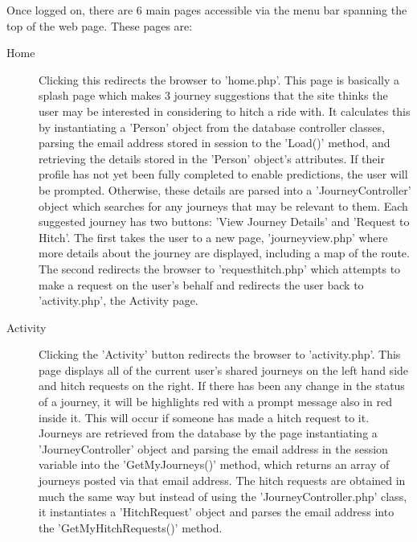 		Once logged on, there are 6 main pages accessible via the menu bar spanning the top of the web page. These pages are: 
		\begin{description}
		\item[Home] Clicking this redirects the browser to 'home.php'. This page is basically a splash page which makes 3 journey suggestions that the site thinks the user may be interested in considering to hitch a ride with. It calculates this by instantiating a 'Person' object from the database controller classes, parsing the email address stored in session to the 'Load()' method, and retrieving the details stored in the 'Person' object's attributes. If their profile has not yet been fully completed to enable predictions, the user will be prompted. Otherwise, these details are parsed into a 'Journey\textunderscore Controller' object which searches for any journeys that may be relevant to them. Each suggested journey has two buttons: 'View Journey Details' and 'Request to Hitch'. The first takes the user to a new page, 'journey\textunderscore view.php' where more details about the journey are displayed, including a map of the route. The second redirects the browser to 'request\textunderscore hitch.php' which attempts to make a request on the user's behalf and redirects the user back to 'activity.php', the Activity page.
		\item[Activity] Clicking the 'Activity' button redirects the browser to 'activity.php'. This page displays all of the current user's shared journeys on the left hand side and hitch requests on the right. If there has been any change in the status of a journey, it will be highlights red with a prompt message also in red inside it. This will occur if someone has made a hitch request to it. Journeys are retrieved from the database by the page instantiating a 'Journey\textunderscore Controller' object and parsing the email address in the session variable into the 'GetMyJourneys()' method, which returns an array of journeys posted via that email address. The hitch requests are obtained in much the same way but instead of using the 'Journey\textunderscore Controller.php' class, it instantiates a 'Hitch\textunderscore Request' object and parses the email address into the 'GetMyHitchRequests()' method. 
		

\end{description}

